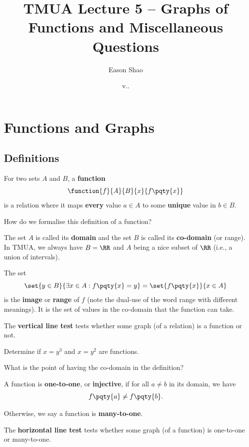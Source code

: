\documentclass{article}
\title{TMUA Lecture 5 -- Graphs of Functions and Miscellaneous Questions}
\author{Eason Shao}
\date{v.\DATE.\COMMITSHA}
\begin{document}
\maketitle

\tableofcontents

\section{Functions and Graphs}
\subsection{Definitions}

For two sets \(A\) and \(B\), a \textbf{function}
\[
    \function{f}{A}{B}{x}{f\pqty{x}}
\]
is a relation where it maps \textbf{every} value \(a \in A\) to some \textbf{unique} value in \(b \in B\).

\begin{problem}
    How do we formalise this definition of a function?
\end{problem}

The set \(A\) is called its \textbf{domain} and the set \(B\) is called its \textbf{co-domain} (or range). In TMUA, we always have \(B = \RR\) and \(A\) being a nice subset of \(\RR\) (i.e., a union of intervals).

The set
\[
    \set{y \in B}{\exists x \in A: f\pqty{x} = y} = \set{f\pqty{x}}{x \in A}
\]
is the \textbf{image} or \textbf{range} of \(f\) (note the dual-use of the word range with different meanings). It is the set of values in the co-domain that the function can take.

The \textbf{vertical line test} tests whether some graph (of a relation) is a function or not.

\begin{example}
    Determine if \(x = y^3\) and \(x = y^2\) are functions.
\end{example}

\begin{problem}
    What is the point of having the co-domain in the definition?
\end{problem}

A function is \textbf{one-to-one}, or \textbf{injective}, if for all \(a \neq b\) in its domain, we have
\[
    f\pqty{a} \neq f\pqty{b}.
\]

Otherwise, we say a function is \textbf{many-to-one}.

The \textbf{horizontal line test} tests whether some graph (of a function) is one-to-one or many-to-one.
\end{document}
